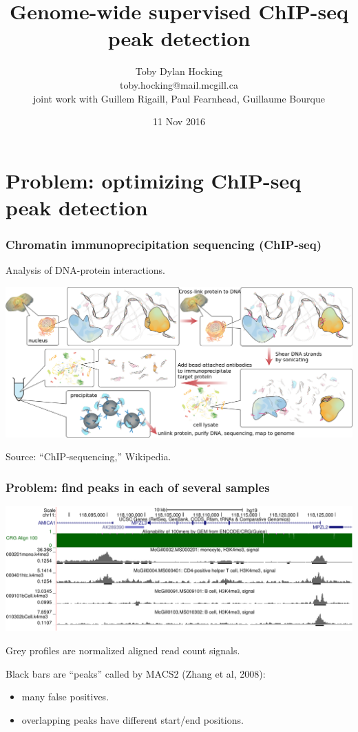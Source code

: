 \documentclass{beamer}
\begin{document}
\title{Genome-wide supervised ChIP-seq peak detection}

\author{
  Toby Dylan Hocking\\
  toby.hocking@mail.mcgill.ca\\
  joint work with Guillem Rigaill, Paul Fearnhead, 
  Guillaume Bourque}

\date{11 Nov 2016}

\maketitle

\section{Problem: optimizing ChIP-seq peak detection}

\begin{frame}
  \frametitle{Chromatin immunoprecipitation sequencing (ChIP-seq)}
  Analysis of DNA-protein interactions.

  \includegraphics[width=\textwidth]{Chromatin_immunoprecipitation_sequencing_wide.png}

  Source: ``ChIP-sequencing,'' Wikipedia.
\end{frame}

\begin{frame}
  \frametitle{Problem: find peaks in each of several samples}
  \includegraphics[width=\textwidth]{screenshot-ucsc-edited}

  Grey profiles are normalized aligned read count signals.

  Black bars are ``peaks'' called by MACS2 (Zhang et al, 2008):
  \begin{itemize}
  \item \alert<1>{many false positives}.
  \item overlapping peaks have different start/end positions.
  \end{itemize}
\end{frame}
\end{document}
